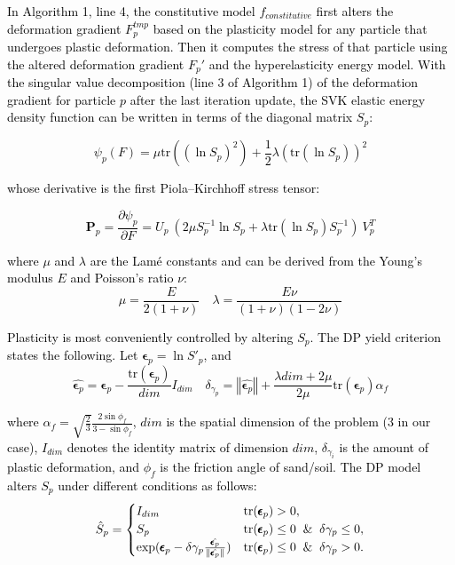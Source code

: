 \documentclass[letterpaper, 10 pt, journal, twoside]{ieeetran}
\newcommand{\rp}[1]{\textcolor{black}{#1}}
\begin{document}
\rp{In Algorithm 1, line 4, the constitutive model $f_{constitutive}$ first alters the deformation gradient $F^{tmp}_p$ based on the plasticity model for any particle that undergoes plastic deformation. Then it computes the stress of that particle using the altered deformation gradient $F_p'$ and the hyperelasticity energy model. With the singular value decomposition (line 3 of Algorithm 1) of the deformation gradient for particle $p$ after the last iteration update, the SVK elastic energy density function can be written in terms of the diagonal matrix $S_p$:}

\rp{\begin{equation}\label{eq:SVK}
\psi_p(F) = \mu \mathrm{tr}((\ln S_p)^2) + \frac{1}{2}\lambda ( \mathrm{tr}(\ln S_p))^2
\end{equation}}

\noindent \rp{whose derivative is the first Piola–Kirchhoff stress tensor:}

\rp{\begin{equation}\label{eq:piola}
\bm{P}_p = \frac{\partial\psi_p}{\partial F} = U_p\ (2\mu S^{-1}_p\ln S_p + \lambda \mathrm{tr}(\ln S_p)S^{-1}_p)\ V^T_p
\end{equation}}

\noindent \rp{where $\mu$ and $\lambda$ are the Lam\'e constants and can be derived from the Young's modulus $E$ and Poisson's ratio $\nu$:
\begin{equation}
\mu = \frac{E}{2(1+\nu)} \quad \lambda = \frac{E \nu}{(1+\nu)(1-2\nu)}
\end{equation}}

\rp{Plasticity is most conveniently controlled by altering $S_p$. The DP yield criterion states the following. Let $\pmb{\epsilon}_p = \ln S'_p$, and
\begin{equation}
\hat{\pmb{\epsilon}_p} = \pmb{\epsilon}_p - \frac{\mathrm{tr}(\pmb{\epsilon}_p)}{dim}I_{dim} \quad \delta_{\gamma_{p}} = \left\Vert \hat{\pmb{\epsilon}_p} \right\Vert + \frac{\lambda dim+2\mu}{2\mu}\mathrm{tr}(\pmb{\epsilon}_p) \alpha_f
\end{equation}}

\noindent \rp{where $\alpha_f = \sqrt{\frac{2}{3}}\frac{2\sin{\phi_{f}}}{3-\sin{\phi_{f}}}$, $dim$ is the spatial dimension of the problem ($3$ in our case), $I_{dim}$ denotes the identity matrix of dimension $dim$, $\delta_{\gamma_{i}}$ is the amount of plastic deformation, and $\phi_{f}$ is the friction angle of sand/soil. The DP model alters $S_p$ under different conditions as follows:
\begin{equation}
    \hat{S}_p=
    \begin{cases}
    I_{dim} \hfill & \mathrm{tr}(\pmb{\epsilon}_p) > 0,\\
    S_p \hfill & \mathrm{tr}(\pmb{\epsilon}_p) \leq 0 \And \delta \gamma_{p} \leq 0, \\
    \exp(\pmb{\epsilon}_p-\delta \gamma_{p}\frac{\hat{\pmb{\epsilon}_p}}{\|\hat{\pmb{\epsilon}_p}\|}) \hfill & \mathrm{tr}(\pmb{\epsilon}_p) \leq 0 \And \delta \gamma_{p} > 0.
    \end{cases}\label{eq:DP}
\end{equation}}
\end{document}
